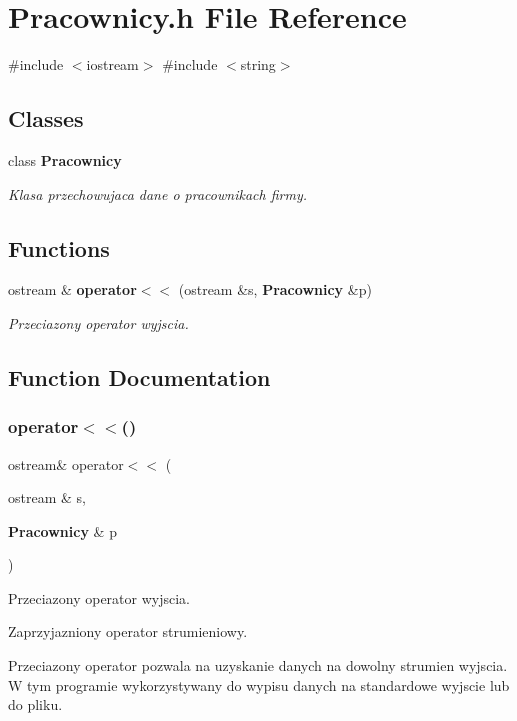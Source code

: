\section{Pracownicy.\+h File Reference}
\label{_pracownicy_8h}
{\ttfamily \#include $<$iostream$>$}\newline
{\ttfamily \#include $<$string$>$}\newline
\subsection*{Classes}
\begin{DoxyCompactItemize}
\item 
class \textbf{ Pracownicy}
\begin{DoxyCompactList}\small\item\em Klasa przechowujaca dane o pracownikach firmy. \end{DoxyCompactList}\end{DoxyCompactItemize}
\subsection*{Functions}
\begin{DoxyCompactItemize}
\item 
ostream \& \textbf{ operator$<$$<$} (ostream \&s, \textbf{ Pracownicy} \&p)
\begin{DoxyCompactList}\small\item\em Przeciazony operator wyjscia. \end{DoxyCompactList}\end{DoxyCompactItemize}


\subsection{Function Documentation}
\mbox{\label{_pracownicy_8h_a982680671c2057a272ee1ab713a2fc5f}} 
\subsubsection{operator$<$$<$()}
{\footnotesize\ttfamily ostream\& operator$<$$<$ (\begin{DoxyParamCaption}\item[{ostream \&}]{s,  }\item[{\textbf{ Pracownicy} \&}]{p }\end{DoxyParamCaption})}



Przeciazony operator wyjscia. 

Zaprzyjazniony operator strumieniowy.

Przeciazony operator pozwala na uzyskanie danych na dowolny strumien wyjscia. W tym programie wykorzystywany do wypisu danych na standardowe wyjscie lub do pliku. 